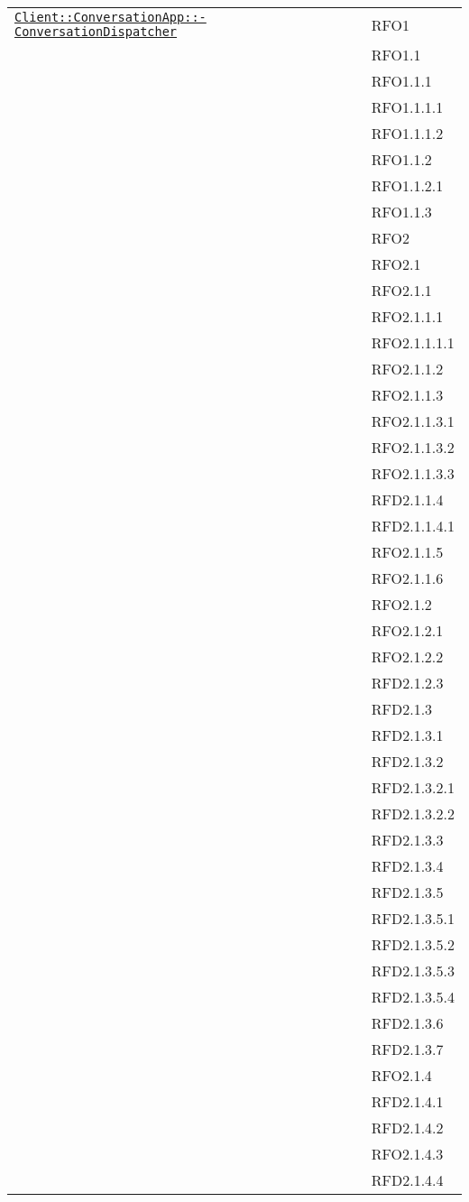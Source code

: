 \begin{longtable}{|>{\centering}m{10cm}|m{3cm}<{\centering}|}
\hyperref[Client::ConversationApp::ConversationDispatcher]{\texttt{Client::ConversationApp::-\linebreak ConversationDispatcher}} & RFO1\\
& RFO1.1\\
& RFO1.1.1\\
& RFO1.1.1.1\\
& RFO1.1.1.2\\
& RFO1.1.2\\
& RFO1.1.2.1\\
& RFO1.1.3\\
& RFO2\\
& RFO2.1\\
& RFO2.1.1\\
& RFO2.1.1.1\\
& RFO2.1.1.1.1\\
& RFO2.1.1.2\\
& RFO2.1.1.3\\
& RFO2.1.1.3.1\\
& RFO2.1.1.3.2\\
& RFO2.1.1.3.3\\
& RFD2.1.1.4\\
& RFD2.1.1.4.1\\
& RFO2.1.1.5\\
& RFO2.1.1.6\\
& RFO2.1.2\\
& RFO2.1.2.1\\
& RFO2.1.2.2\\
& RFD2.1.2.3\\
& RFD2.1.3\\
& RFD2.1.3.1\\
& RFD2.1.3.2\\
& RFD2.1.3.2.1\\
& RFD2.1.3.2.2\\
& RFD2.1.3.3\\
& RFD2.1.3.4\\
& RFD2.1.3.5\\
& RFD2.1.3.5.1\\
& RFD2.1.3.5.2\\
& RFD2.1.3.5.3\\
& RFD2.1.3.5.4\\
& RFD2.1.3.6\\
& RFD2.1.3.7\\
& RFO2.1.4\\
& RFD2.1.4.1\\
& RFD2.1.4.2\\
& RFO2.1.4.3\\
& RFD2.1.4.4\\

\end{longtable}
